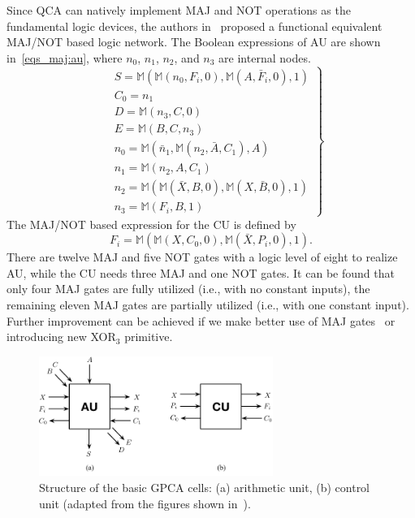 \documentclass[9pt,journal,compsoc]{IEEEtran}
\begin{document}
Since QCA can natively implement MAJ and NOT operations as the fundamental logic devices, the authors in~\cite{2} proposed a functional equivalent MAJ/NOT based logic network. The Boolean expressions of AU are shown in~\eqref{eqs_maj:au}, where $n_0$, $n_1$, $n_2$, and $n_3$ are internal nodes.
\begin{equation}~\label{eqs_maj:au}
\left.
\begin{split}
& S = \mathbb{M}(\mathbb{M}(n_0, F_i, 0),\mathbb{M}(A, \bar F_i, 0 ), 1) \\
&C_{0} = n_1 \\
&D = \mathbb{M}(n_3, C, 0)\\    
&E = \mathbb{M}(B, C, n_3)\\
& n_0 = \mathbb{M}( \bar n_1, \mathbb{M}(n_2, \bar A, C_1), A )\\
& n_1 = \mathbb{M}(n_2, A, C_1) \\
& n_2 = \mathbb{M}(\mathbb{M}(\bar X, B, 0), \mathbb{M}(X, \bar B, 0 ), 1) \\
& n_3 = \mathbb{M}(F_i, B, 1)
\end{split}
\right\}
\end{equation}
The MAJ/NOT based expression for the CU is defined by
\begin{equation}\label{eq:cu}
F_{i} = \mathbb{M}(\mathbb{M}(X, C_0, 0), \mathbb{M}(\bar X, P_i, 0 ), 1).
\end{equation}
There are twelve MAJ and five NOT gates with a logic level of eight to realize AU, while the CU needs three MAJ and one NOT gates.
It can be found that only four MAJ gates are fully utilized (i.e., with no constant inputs), the remaining eleven MAJ gates are partially utilized (i.e., with one constant input). Further improvement can be achieved if we make better use of MAJ gates~\cite{Abedi2018Decimal} or introducing new XOR$_3$ primitive. 

 
 
\begin{figure}[t]
    \centering
    \includegraphics[width=3.0in]{fig/aucu_cells.pdf}\vspace{-3ex}
    \caption{Structure of the basic GPCA cells: (a) arithmetic unit, (b) control unit  (adapted from the figures shown in~\cite{4,2}).} \label{fig:structure}
    \vspace{-3ex}
\end{figure}    
\end{document}
